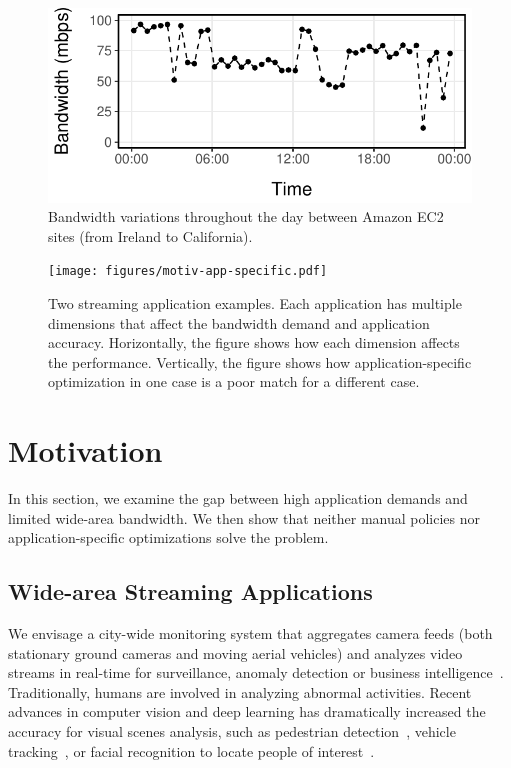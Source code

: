 \begin{figure}
  \centering
  \includegraphics[width=.95\linewidth]{figures/aws-variation.pdf}
  \caption{Bandwidth variations throughout the day between Amazon EC2 sites
    (from Ireland to California).}
  \label{fig:bw}
\end{figure}

\begin{figure}
  \centering
  \texttt{[image: figures/motiv-app-specific.pdf]}
  \caption{Two streaming application examples. Each application has multiple
    dimensions that affect the bandwidth demand and application
    accuracy. Horizontally, the figure shows how each dimension affects the
    performance. Vertically, the figure shows how application-specific
    optimization in one case is a poor match for a different case.}
  \label{fig:app-specific}
\end{figure}

\section{Motivation}
\label{sec:motivation}

In this section, we examine the gap between high application demands and limited
wide-area bandwidth. We then show that neither manual policies nor
application-specific optimizations solve the problem.

\subsection{Wide-area Streaming Applications}
\label{sec:wide-area-streaming}

 We envisage a city-wide monitoring system that
aggregates camera feeds (both stationary ground cameras and moving aerial
vehicles) and analyzes video streams in real-time for surveillance, anomaly
detection or business intelligence~\cite{oh2011large}. Traditionally, humans are
involved in analyzing abnormal activities. Recent advances in computer vision
and deep learning has dramatically increased the accuracy for visual scenes
analysis, such as pedestrian detection~\cite{dollar2012pedestrian}, vehicle
tracking~\cite{coifman1998real}, or facial recognition to locate people of
interest~\cite{parkhi2015deep, Lu:2015:SHF:2888116.2888245}.

